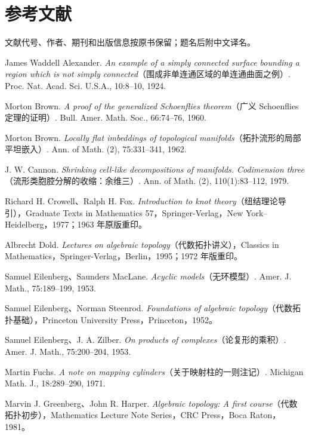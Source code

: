 \chapter*{参考文献}
文献代号、作者、期刊和出版信息按原书保留；题名后附中文译名。
\begin{description}[style=nextline]
\item[{[Ale24]}] James Waddell Alexander. \textit{An example of a simply connected surface bounding a region which is not simply connected}（围成非单连通区域的单连通曲面之例）. Proc. Nat. Acad. Sci. U.S.A., 10:8--10, 1924.
\item[{[Bro60]}] Morton Brown. \textit{A proof of the generalized Schoenflies theorem}（广义 Schoenflies 定理的证明）. Bull. Amer. Math. Soc., 66:74--76, 1960.
\item[{[Bro62]}] Morton Brown. \textit{Locally flat imbeddings of topological manifolds}（拓扑流形的局部平坦嵌入）. Ann. of Math. (2), 75:331--341, 1962.
\item[{[Can79]}] J. W. Cannon. \textit{Shrinking cell-like decompositions of manifolds. Codimension three}（流形类胞腔分解的收缩：余维三）. Ann. of Math. (2), 110(1):83--112, 1979.
\item[{[CF77]}] Richard H. Crowell、Ralph H. Fox. \textit{Introduction to knot theory}（纽结理论导引），Graduate Texts in Mathematics 57，Springer-Verlag，New York--Heidelberg，1977；1963 年原版重印。
\item[{[Dol95]}] Albrecht Dold. \textit{Lectures on algebraic topology}（代数拓扑讲义），Classics in Mathematics，Springer-Verlag，Berlin，1995；1972 年版重印。
\item[{[EM53]}] Samuel Eilenberg、Saunders MacLane. \textit{Acyclic models}（无环模型）. Amer. J. Math., 75:189--199, 1953.
\item[{[ES52]}] Samuel Eilenberg、Norman Steenrod. \textit{Foundations of algebraic topology}（代数拓扑基础），Princeton University Press，Princeton，1952。
\item[{[EZ53]}] Samuel Eilenberg、J. A. Zilber. \textit{On products of complexes}（论复形的乘积）. Amer. J. Math., 75:200--204, 1953.
\item[{[Fuc71]}] Martin Fuchs. \textit{A note on mapping cylinders}（关于映射柱的一则注记）. Michigan Math. J., 18:289--290, 1971.
\item[{[GH81]}] Marvin J. Greenberg、John R. Harper. \textit{Algebraic topology: A first course}（代数拓扑初步），Mathematics Lecture Note Series，CRC Press，Boca Raton，1981。

\end{description}
